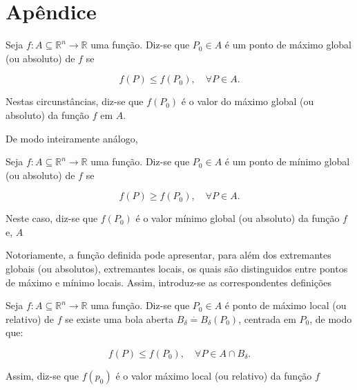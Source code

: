 \section{Apêndice}

\begin{definition}
	Seja $ f:A \subseteq \mathbb{R}^{n} \rightarrow \mathbb{R} $ uma função. Diz-se que $ P_{0} \in A $ é um ponto de máximo global (ou absoluto) de $ f $ se 
	
	\begin{equation*}
		f(P) \leq f(P_{0}), \quad \forall P \in A.
	\end{equation*}
	
	Nestas circunstâncias, diz-se que $ f(P_{0}) $ é o valor do máximo global (ou absoluto) da função $ f $ em $ A $. 
\end{definition}

De modo inteiramente análogo, 

\begin{definition}
	Seja $ f:A \subseteq \mathbb{R}^{n} \rightarrow \mathbb{R} $ uma função. Diz-se que $ P_{0} \in A$ é um ponto de mínimo global (ou absoluto) de $ f $ se
	
	\begin{equation*}
		f(P) \geq f(P_{0}), \quad \forall P \in A.
	\end{equation*}
	
	Neste caso, diz-se que $ f(P_{0}) $ é o valor mínimo global (ou absoluto) da função $ f $ e, $ A $
\end{definition}

Notoriamente, a função definida pode apresentar, para além dos extremantes globais (ou absolutos), extremantes locais, os quais são distinguidos entre pontos de máximo e mínimo locais. Assim, introduz-se as correspondentes definições 

\begin{definition}
	Seja $ f: A \subseteq \mathbb{R}^{n} \rightarrow \mathbb{R} $ uma função. Diz-se que $ P_{0} \in A $ é ponto de máximo local (ou relativo) de $ f $ se existe uma bola aberta $ B_{\delta} \overset{\cdot}{=} B_{\delta}(P_{0})$, centrada em $ P_{0} $, de modo que:
	
	\begin{equation*}
		f(P) \leq f(P_{0}), \quad \forall P \in A \cap B_{\delta}.
	\end{equation*}
	
	Assim, diz-se que $ f(p_{0}) $ é o valor máximo local (ou relativo) da função $ f $
\end{definition}

